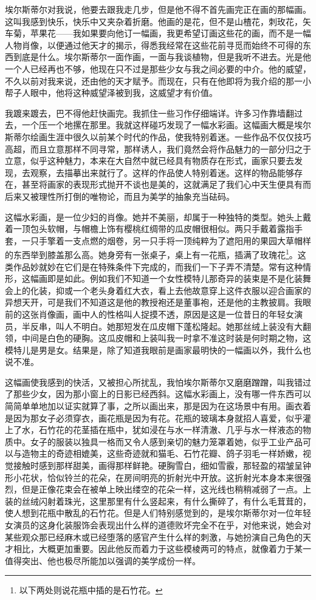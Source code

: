 \par 埃尔斯蒂尔对我说，他要去跟我走几步，但是他不得不首先画完正在画的那幅画。这叫我感到快乐，快乐中又夹杂着折磨。他画的是花，但不是山楂花，刺玫花，矢车菊，苹果花——我如果要向他订一幅画，我更希望订画这些花的画，而不是一幅人物肖像，以便通过他天才的揭示，得悉我经常在这些花前寻觅而始终不可得的东西到底是什么。埃尔斯蒂尔一面作画，一面与我谈植物，但是我听不进去。光是他一个人已经再也不够，他现在只不过是那些少女与我之间必要的中介。他的威望，不久以前对我来说，还由他的天才赋予。而现在，只有在他即将为我介绍的那一小帮子人眼中，他将这种威望泽被到我，这威望才有价值。
\par 我踱来踱去，巴不得他赶快画完。我抓住一些习作仔细端详。许多习作靠墙翻过去，一个压一个地摞在那里。我就这样碰巧发现了一幅水彩画。这幅画大概是埃尔斯蒂尔绘画生涯中很久以前某个时代的作品，使我特别着迷。一些作品不仅仅技巧高超，而且立意那样不同寻常，那样诱人，我们竟然会将作品魅力的一部分归之于立意，似乎这种魅力，本来在大自然中就已经具有物质存在形式，画家只要去发现，去观察，去描摹出来就行了。这样的作品使人特别着迷。这样的物品能够存在，甚至将画家的表现形式抛开不谈也是美的，这就满足了我们心中天生便具有而后来又被理性所打倒的唯物论，而且为美学的抽象充当砝码。
\par 这幅水彩画，是一位少妇的肖像。她并不美丽，却属于一种独特的类型。她头上戴着一顶包头软帽，与帽檐上饰有樱桃红绸带的瓜皮帽很相似。两只手戴着露指手套，一只手擎着一支点燃的烟卷，另一只手将一顶纯粹为了遮阳用的果园大草帽样的东西举到膝盖那么高。她身旁有一张桌子，桌上有一花瓶，插满了玫瑰花\footnote{以下两处则说花瓶中插的是石竹花。}。这类作品妙就妙在它们是在特殊条件下完成的，而我们一下子弄不清楚。常有这种情形，这幅画即是如此。例如我们不知道一个女性模特儿那奇异的装束是不是化装舞会上的化装，抑或一个老头身着红大衣，看上去他故意穿上这件衣服以迎合画家的异想天开，可是我们不知道这是他的教授袍还是董事袍，还是他的主教披肩。我眼前的这张肖像画，画中人的性格叫人捉摸不透，原因是这是一位昔日的年轻女演员，半反串，叫人不明白。她那短发在瓜皮帽下蓬松隆起。她那丝绒上装没有大翻领，中间是白色的硬胸。这瓜皮帽和上装叫我一时拿不准这时装是何时期之物，这模特儿是男是女。结果是，除了知道我眼前是画家最明快的一幅画以外，我什么也说不准。
\par 这幅画使我感到的快活，又被担心所扰乱，我怕埃尔斯蒂尔又磨磨蹭蹭，叫我错过了那些少女，因为那小窗上的日影已经西斜。这幅水彩画上，没有哪一件东西可以简简单单地加以证实就算了事，之所以画出来，那是因为在这场景中有用。画衣着是因为那女子必须穿衣，画花瓶是因为有花。花瓶的玻璃本身就招人喜爱，似乎灌上了水，石竹花的花茎插在瓶中，犹如浸在与水一样清澈、几乎与水一样液态的物质中。女子的服装以独具一格而又令人感到亲切的魅力笼罩着她，似乎工业产品可以与造物主的奇迹相媲美，这些奇迹就和猫毛、石竹花瓣、鸽子羽毛一样娇嫩，视觉接触时感到那样甜美，画得那样鲜艳。硬胸雪白，细如雪霰，那轻盈的褶皱呈钟形小花状，恰似铃兰的花朵，在房间明亮的折射光中开放。这折射光本身本来很强烈，但是正像花束会在被单上映出缕空的花朵一样，这光线也稍稍减弱了一点。上装的丝绒闪射着珠光，这里那里有什么竖起来，有什么撕碎了，有什么毛茸茸的，使人想到花瓶中散乱的石竹花。但是人们特别感觉到的，是埃尔斯蒂尔对一位年轻女演员的这身化装服饰会表现出什么样的道德败坏完全不在乎，对他来说，她会对某些观众那已经麻木或已经堕落的感官产生什么样的刺激，与她扮演自己角色的天才相比，大概更加重要。因此他反而着力于这些模棱两可的特点，就像着力于某一值得突出、他也极尽所能加以强调的美学成份一样。
